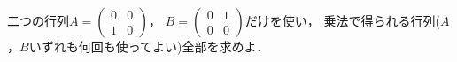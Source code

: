 \documentclass[../../main.tex]{subfiles}
\begin{document}
二つの行列$A=
\begin{pmatrix} 0 & 0 \\ 1 & 0
\end{pmatrix}$，
$B=
\begin{pmatrix} 0 & 1 \\ 0 & 0
\end{pmatrix}$だけを使い，
乗法で得られる行列($A$，$B$いずれも何回も使ってよい)全部を求めよ．
\end{document}
